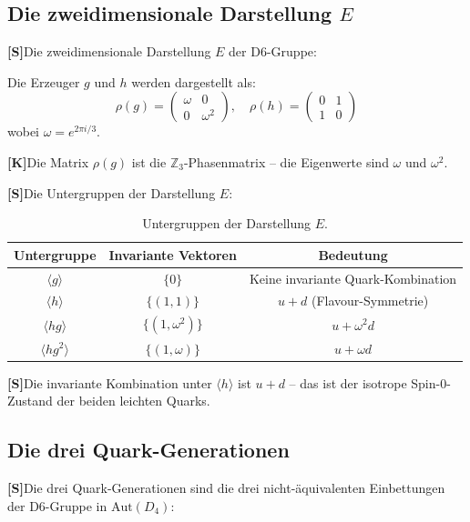 \documentclass[11pt,a4paper]{article}
\newcommand{\Kstatus}{\textbf{[K]}}
\newcommand{\Sstatus}{\textbf{[S]}}
\begin{document}
	\subsection{Die zweidimensionale Darstellung $E$}
	
	\Sstatus Die zweidimensionale Darstellung $E$ der D6-Gruppe:
	
	Die Erzeuger $g$ und $h$ werden dargestellt als:
	\begin{equation}
		\rho(g) = \begin{pmatrix} \omega & 0 \\ 0 & \omega^2 \end{pmatrix}, \quad
		\rho(h) = \begin{pmatrix} 0 & 1 \\ 1 & 0 \end{pmatrix}
	\end{equation}
	wobei $\omega = e^{2\pi i/3}$.
	
	\Kstatus Die Matrix $\rho(g)$ ist die $\mathbb{Z}_3$-Phasenmatrix -- die Eigenwerte sind $\omega$ und $\omega^2$.
	
	\Sstatus Die Untergruppen der Darstellung $E$:
	
	\begin{table}[h!]
		\centering
		\caption{Untergruppen der Darstellung $E$.}
		\label{tab:e_subgroups}
		\begin{tabular}{c c c}
			\toprule
			\textbf{Untergruppe} & \textbf{Invariante Vektoren} & \textbf{Bedeutung} \\
			\midrule
			$\langle g \rangle$ & $\{0\}$ & Keine invariante Quark-Kombination \\
			$\langle h \rangle$ & $\{(1,1)\}$ & $u+d$ (Flavour-Symmetrie) \\
			$\langle hg \rangle$ & $\{(1,\omega^2)\}$ & $u+\omega^2 d$ \\
			$\langle hg^2 \rangle$ & $\{(1,\omega)\}$ & $u+\omega d$ \\
			\bottomrule
		\end{tabular}
	\end{table}
	
	\Sstatus Die invariante Kombination unter $\langle h \rangle$ ist $u+d$ -- das ist der isotrope Spin-0-Zustand der beiden leichten Quarks.
	
	\subsection{Die drei Quark-Generationen}
	
	\Sstatus Die drei Quark-Generationen sind die drei nicht-äquivalenten Einbettungen der D6-Gruppe in $\text{Aut}(D_4)$:
	
\end{document}
